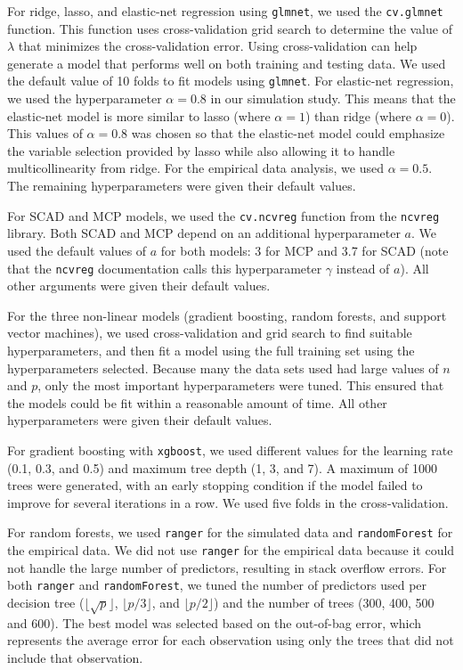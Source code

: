\documentclass{article}
\begin{document}
For ridge, lasso, and elastic-net regression using \lstinline!glmnet!, we used the \lstinline!cv.glmnet! function. This function uses cross-validation grid search to determine the value of $\lambda$ that minimizes the cross-validation error. Using cross-validation can help generate a model that performs well on both training and testing data. We used the default value of 10 folds to fit models using \lstinline!glmnet!. For elastic-net regression, we used the hyperparameter $\alpha = 0.8$ in our simulation study. This means that the elastic-net model is more similar to lasso (where $\alpha = 1$) than ridge (where $\alpha = 0$). This values of $\alpha = 0.8$ was chosen so that the elastic-net model could emphasize the variable selection provided by lasso while also allowing it to handle multicollinearity from ridge. For the empirical data analysis, we used $\alpha = 0.5$. The remaining hyperparameters were given their default values.

For SCAD and MCP models, we used the \lstinline!cv.ncvreg! function from the \lstinline!ncvreg! library. Both SCAD and MCP depend on an additional hyperparameter $a$. We used the default values of $a$ for both models: 3 for MCP and 3.7 for SCAD (note that the \lstinline!ncvreg! documentation calls this hyperparameter $\gamma$ instead of $a$). All other arguments were given their default values. 

For the three non-linear models (gradient boosting, random forests, and support vector machines), we used cross-validation and grid search to find suitable hyperparameters, and then fit a model using the full training set using the hyperparameters selected. Because many the data sets used had large values of $n$ and $p$, only the most important hyperparameters were tuned. This ensured that the models could be fit within a reasonable amount of time. All other hyperparameters were given their default values.

For gradient boosting with \lstinline!xgboost!, we used different values for the learning rate (0.1, 0.3, and 0.5) and maximum tree depth (1, 3, and 7). A maximum of 1000 trees were generated, with an early stopping condition if the model failed to improve for several iterations in a row. We used five folds in the cross-validation.

For random forests, we used \lstinline!ranger! for the simulated data and \lstinline!randomForest! for the empirical data. We did not use \lstinline!ranger! for the empirical data because it could not handle the large number of predictors, resulting in stack overflow errors. For both \lstinline!ranger! and \lstinline!randomForest!, we tuned the number of predictors used per decision tree ($\lfloor \sqrt{p}\rfloor$, $\lfloor p / 3 \rfloor$, and $\lfloor p / 2 \rfloor$) and the number of trees (300, 400, 500 and 600). The best model was selected based on the out-of-bag error, which represents the average error for each observation using only the trees that did not include that observation.
\end{document}
